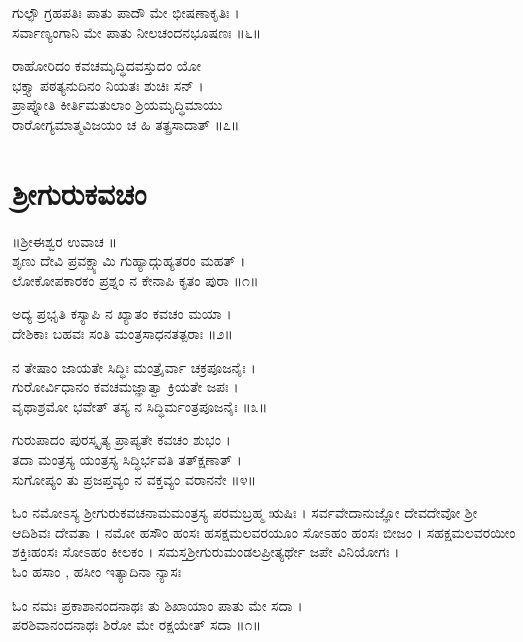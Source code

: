 ಗುಲ್ಫೌ ಗ್ರಹಪತಿಃ ಪಾತು ಪಾದೌ ಮೇ ಭೀಷಣಾಕೃತಿಃ ।\\
ಸರ್ವಾಣ್ಯಂಗಾನಿ ಮೇ ಪಾತು ನೀಲಚಂದನಭೂಷಣಃ ॥೬॥


ರಾಹೋರಿದಂ ಕವಚಮೃದ್ಧಿದವಸ್ತುದಂ ಯೋ\\
ಭಕ್ತ್ಯಾ ಪಠತ್ಯನುದಿನಂ ನಿಯತಃ ಶುಚಿಃ ಸನ್ ।\\
ಪ್ರಾಪ್ನೋತಿ ಕೀರ್ತಿಮತುಲಾಂ ಶ್ರಿಯಮೃದ್ಧಿಮಾಯು\\
ರಾರೋಗ್ಯಮಾತ್ಮವಿಜಯಂ ಚ ಹಿ ತತ್ಪ್ರಸಾದಾತ್ ॥೭॥

\section{ಶ್ರೀಗುರುಕವಚಂ}
॥ಶ್ರೀಈಶ್ವರ ಉವಾಚ ॥\\
ಶೃಣು ದೇವಿ ಪ್ರವಕ್ಷ್ಯಾಮಿ ಗುಹ್ಯಾದ್ಗುಹ್ಯತರಂ ಮಹತ್ ।\\
ಲೋಕೋಪಕಾರಕಂ ಪ್ರಶ್ನಂ ನ ಕೇನಾಪಿ ಕೃತಂ ಪುರಾ ॥೧॥

ಅದ್ಯ ಪ್ರಭೃತಿ ಕಸ್ಯಾಪಿ ನ ಖ್ಯಾತಂ ಕವಚಂ ಮಯಾ ।\\
ದೇಶಿಕಾಃ ಬಹವಃ ಸಂತಿ ಮಂತ್ರಸಾಧನತತ್ಪರಾಃ ॥೨॥

ನ ತೇಷಾಂ ಜಾಯತೇ ಸಿದ್ಧಿಃ ಮಂತ್ರೈರ್ವಾ ಚಕ್ರಪೂಜನೈಃ ।\\
ಗುರೋರ್ವಿಧಾನಂ ಕವಚಮಜ್ಞಾತ್ವಾ ಕ್ರಿಯತೇ ಜಪಃ ।\\
ವೃಥಾಶ್ರಮೋ ಭವೇತ್ ತಸ್ಯ ನ ಸಿದ್ಧಿರ್ಮಂತ್ರಪೂಜನೈಃ ॥೩॥

ಗುರುಪಾದಂ ಪುರಸ್ಕೃತ್ಯ ಪ್ರಾಪ್ಯತೇ ಕವಚಂ ಶುಭಂ ।\\
ತದಾ ಮಂತ್ರಸ್ಯ ಯಂತ್ರಸ್ಯ ಸಿದ್ಧಿರ್ಭವತಿ ತತ್ಕ್ಷಣಾತ್ ।\\
ಸುಗೋಪ್ಯಂ ತು ಪ್ರಜಪ್ತವ್ಯಂ ನ ವಕ್ತವ್ಯಂ ವರಾನನೇ ॥೪॥


ಓಂ ನಮೋಽಸ್ಯ ಶ್ರೀಗುರುಕವಚನಾಮಮಂತ್ರಸ್ಯ ಪರಮಬ್ರಹ್ಮ ಋಷಿಃ  । ಸರ್ವವೇದಾನುಜ್ಞೋ ದೇವದೇವೋ ಶ್ರೀ ಆದಿಶಿವಃ ದೇವತಾ । ನಮೋ ಹಸೌಂ ಹಂಸಃ ಹಸಕ್ಷಮಲವರಯೂಂ ಸೋಽಹಂ ಹಂಸಃ ಬೀಜಂ । ಸಹಕ್ಷಮಲವರಯೀಂ ಶಕ್ತಿಃಹಂಸಃ ಸೋಽಹಂ ಕೀಲಕಂ । ಸಮಸ್ತಶ್ರೀಗುರುಮಂಡಲಪ್ರೀತ್ಯರ್ಥೇ ಜಪೇ ವಿನಿಯೋಗಃ ।\\

ಓಂ ಹಸಾಂ , ಹಸೀಂ ಇತ್ಯಾದಿನಾ ನ್ಯಾಸಃ\\



ಓಂ ನಮಃ ಪ್ರಕಾಶಾನಂದನಾಥಃ ತು ಶಿಖಾಯಾಂ ಪಾತು ಮೇ ಸದಾ ।\\
ಪರಶಿವಾನಂದನಾಥಃ ಶಿರೋ ಮೇ ರಕ್ಷಯೇತ್ ಸದಾ ॥೧॥

